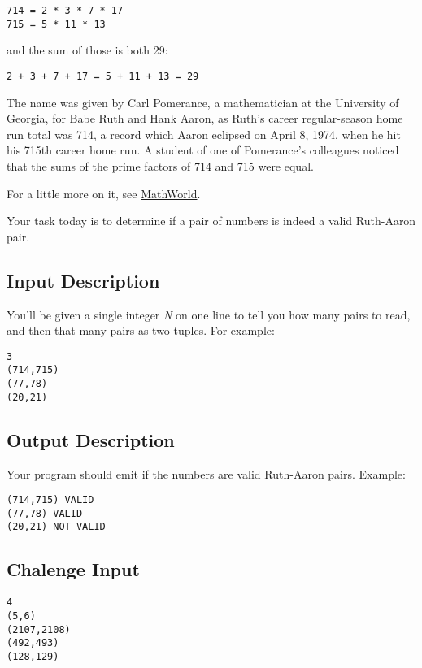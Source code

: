 \begin{verbatim}
714 = 2 * 3 * 7 * 17
715 = 5 * 11 * 13
\end{verbatim}

and the sum of those is both 29:

\begin{verbatim}
2 + 3 + 7 + 17 = 5 + 11 + 13 = 29
\end{verbatim}

The name was given by Carl Pomerance, a mathematician at the University
of Georgia, for Babe Ruth and Hank Aaron, as Ruth's career
regular-season home run total was 714, a record which Aaron eclipsed on
April 8, 1974, when he hit his 715th career home run. A student of one
of Pomerance's colleagues noticed that the sums of the prime factors of
714 and 715 were equal.

For a little more on it, see
\href{http://mathworld.wolfram.com/Ruth-AaronPair.html}{MathWorld}.

Your task today is to determine if a pair of numbers is indeed a valid
Ruth-Aaron pair.

\subsection{Input Description}\label{input-description-6}

You'll be given a single integer \emph{N} on one line to tell you how
many pairs to read, and then that many pairs as two-tuples. For example:

\begin{verbatim}
3
(714,715)
(77,78)
(20,21)
\end{verbatim}

\subsection{Output Description}\label{output-description-6}

Your program should emit if the numbers are valid Ruth-Aaron pairs.
Example:

\begin{verbatim}
(714,715) VALID
(77,78) VALID
(20,21) NOT VALID
\end{verbatim}

\subsection{Chalenge Input}\label{chalenge-input}

\begin{verbatim}
4
(5,6) 
(2107,2108) 
(492,493) 
(128,129) 
\end{verbatim}

